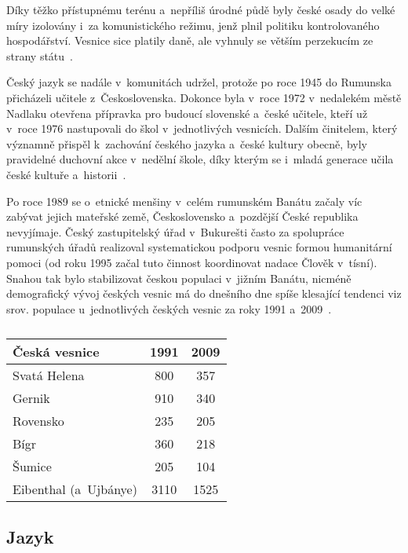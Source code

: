 Díky těžko přístupnému terénu a~nepříliš úrodné půdě byly české osady do velké míry izolovány i~za komunistického režimu, jenž plnil politiku kontrolovaného hospodářství. Vesnice sice platily daně, ale vyhnuly se větším perzekucím ze strany státu~\parencite{Frnochova2012}.

Český jazyk se nadále v~komunitách udržel, protože po roce 1945 do Rumunska přicházeli učitele z~Československa. Dokonce byla v~roce 1972 v~nedalekém městě Nadlaku otevřena přípravka pro budoucí slovenské a~české učitele, kteří už v~roce 1976 nastupovali do škol v~jednotlivých vesnicích. Dalším činitelem, který významně přispěl k~zachování českého jazyka a~české kultury obecně, byly pravidelné duchovní akce v~nedělní škole, díky kterým se i~mladá generace učila české kultuře a~historii~\parencite{Vaculik2009b}.

Po roce 1989 se o~etnické menšiny v~celém rumunském Banátu začaly víc zabývat jejich mateřské země, Československo a~pozdější České republika nevyjímaje. Český zastupitelský úřad v~Bukurešti často za spolupráce rumunských úřadů realizoval systematickou podporu vesnic formou humanitární pomoci (od roku 1995 začal tuto činnost koordinovat nadace Člověk v~tísní). Snahou tak bylo stabilizovat českou populaci v~jižním Banátu, nicméně demografický vývoj českých vesnic má do dnešního dne spíše klesající tendenci viz srov. populace u~jednotlivých českých vesnic za roky 1991 a~2009~\parencite{Gecse2013}.

\begin{table}[h!]
\centering
\begin{tabular}{||l c c||}
\hline
Česká vesnice & 1991 & 2009 \\ [0.5ex]
\hline\hline
Svatá Helena & 800 & 357 \\
\hline
Gernik & 910 & 340 \\
\hline
Rovensko & 235 & 205 \\
\hline
Bígr & 360 & 218 \\
\hline
Šumice & 205 & 104 \\ [1ex]
\hline
Eibenthal (a~Ujbánye) & 3110 & 1525 \\ [1ex]
\hline
\end{tabular}
\caption{}
\label{table:1}
\end{table}

\hypertarget{jazyk}{%
\subsection*{Jazyk}\label{jazyk}}

